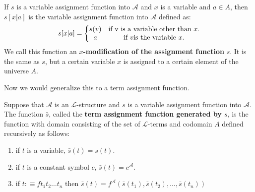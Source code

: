 \documentclass[9pt,a4paper, twocolumn]{article}
\newcommand{\curveL}{\mathcal{L}}
\newcommand{\curveA}{\mathcal{A}}
\begin{document}
            \begin{define}
                If $s$ is a variable assignment function into $\curveA$ and $x$ is a variable and $a \in A$, then $s[x|a]$ is the variable assignment function into $\curveA$ defined as:
                \begin{equation}
                    s[x|a] = \left\{ \begin{matrix} s(v) & \text{if } $v$ \text{ is a variable other than } x.\\ a & \text{if } v \text{is the variable }x.\end{matrix}\right.
                \end{equation}
                We call this function an $x$\textbf{-modification of the assignment function} $s$. It is the same as $s$, but a certain variable $x$ is assigned to a certain element of the universe $A$.
            \end{define}
            Now we would generalize this to a term assignment function.
            \begin{define}
                Suppose that $\curveA$ is an $\curveL$-structure and $s$ is a variable assignment function into $\curveA$. The function $\bar s$, called the \textbf{term assignment function generated by $s$}, is the function with domain consisting of the set of $\curveL$-terms and codomain $A$ defined recursively as follows:
                \begin{enumerate}
                    \item if $t$ is a variable, $\bar s(t) = s(t)$.
                    \item if $t$ is a constant symbol $c$, $\bar s(t) = c^\curveA$.
                    \item if $t:\equiv ft_1t_2\dots t_n$ then $\bar s(t) = f^\curveA(\bar s(t_1),\bar s(t_2),\dots, \bar s(t_n))$
                \end{enumerate}
            \end{define}
            
\end{document}
